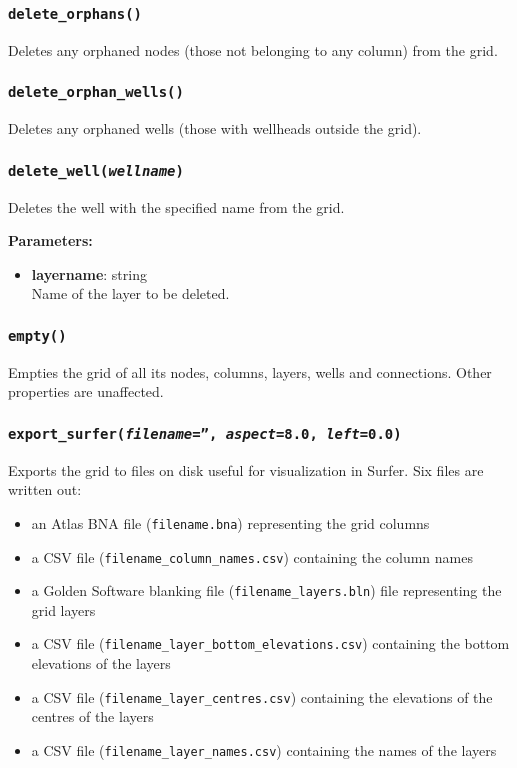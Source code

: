 \subsubsection{\texttt{delete\_orphans()}}
\label{sec:delete_orphans}

Deletes any orphaned nodes (those not belonging to any column) from the grid.

\subsubsection{\texttt{delete\_orphan\_wells()}}
\label{sec:delete_orphan_wells}

Deletes any orphaned wells (those with wellheads outside the grid).

\subsubsection{\texttt{delete\_well(\emph{wellname})}}
\label{sec:delete_well}

Deletes the well with the specified name from the grid.

\textbf{Parameters:}
\begin{itemize}
\item \textbf{layername}: string\\
  Name of the layer to be deleted.
\end{itemize}

\subsubsection{\texttt{empty()}}
\label{sec:empty}

Empties the grid of all its nodes, columns, layers, wells and connections.  Other properties are unaffected.

\subsubsection{\texttt{export\_surfer(\emph{filename}='', \emph{aspect}=8.0, \emph{left}=0.0)}}
\label{sec:export_surfer}

Exports the grid to files on disk useful for visualization in Surfer.  Six files are written out:

\begin{itemize}
\item an Atlas BNA file (\texttt{filename.bna}) representing the grid columns
\item a CSV file (\texttt{filename\_column\_names.csv}) containing the column names
\item a Golden Software blanking file (\texttt{filename\_layers.bln}) file representing the grid layers
\item a CSV file (\texttt{filename\_layer\_bottom\_elevations.csv}) containing the bottom elevations of the layers
\item a CSV file (\texttt{filename\_layer\_centres.csv}) containing the elevations of the centres of the layers
\item a CSV file (\texttt{filename\_layer\_names.csv}) containing the names of the layers
\end{itemize}

